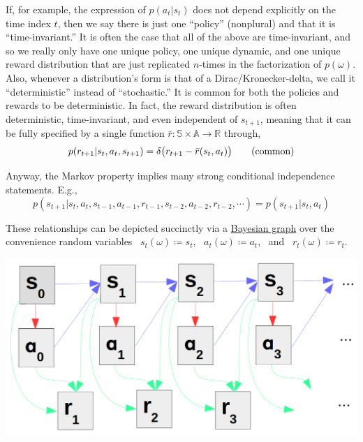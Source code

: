 If, for example, the expression of $p(a_t|s_t)$ does not depend explicitly on the time index $t$, then we say there is just one ``policy'' (nonplural) and that it is ``time-invariant.'' It is often the case that all of the above are time-invariant, and so we really only have one unique policy, one unique dynamic, and one unique reward distribution that are just replicated $n$-times in the factorization of $p(\omega)$.\\

Also, whenever a distribution's form is that of a Dirac/Kronecker-delta, we call it ``deterministic'' instead of ``stochastic.'' It is common for both the policies and rewards to be deterministic. In fact, the reward distribution is often deterministic, time-invariant, and even independent of $s_{t+1}$, meaning that it can be fully specified by a single function $\bar{r}:\mathbb{S}\times\mathbb{A} \to \mathbb{R}$ through,
\begin{equation*}
p(r_{t+1}|s_t,a_t,s_{t+1}) = \delta\big{(}r_{t+1} - \bar{r}(s_t, a_t)\big{)} \tag{common}
\end{equation*}

Anyway, the Markov property implies many strong conditional independence statements. E.g.,
\begin{equation*}
p(s_{t+1}|s_t,a_t,s_{t-1},a_{t-1},r_{t-1},s_{t-2},a_{t-2},r_{t-2},\cdots) = p(s_{t+1}|s_t,a_t)
\end{equation*}

These relationships can be depicted succinctly via a \href{https://en.wikipedia.org/wiki/Bayesian_network}{Bayesian graph} over the convenience random variables \ ${s_t}(\omega) \coloneqq s_t$, \ ${a_t}(\omega) \coloneqq a_t$, \ and \ ${r_t}(\omega) \coloneqq r_t$.
\begin{center}
  \includegraphics[width=\linewidth-1.5in]{include/bayesian_graph.png}
\end{center}

